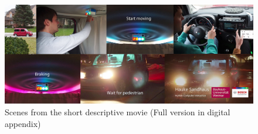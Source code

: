 \begin{figure}
    \includegraphics[width=1\textwidth]{fig/filmstrip.jpg}
    \caption[Filmstrip]{Scenes from the short descriptive movie (Full version in digital appendix)}
    \label{fig:movieStrip}
\end{figure}